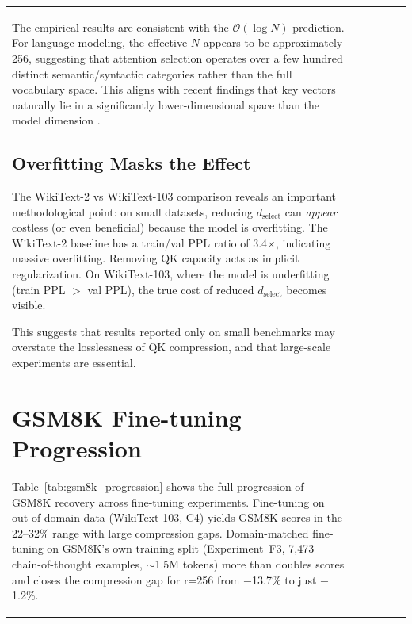 \documentclass[11pt]{article}
\newcommand{\dselect}{d_{\text{select}}}
\newcommand{\BigO}{\mathcal{O}}
\begin{document}
\begin{table}[h]
\begin{tabular}{lccccc}
The empirical results are consistent with the $\BigO(\log N)$ prediction. For language modeling, the effective $N$ appears to be approximately 256, suggesting that attention selection operates over a few hundred distinct semantic/syntactic categories rather than the full vocabulary space. This aligns with recent findings that key vectors naturally lie in a significantly lower-dimensional space than the model dimension \citep{loki2024}.


\subsection{Overfitting Masks the Effect}

The WikiText-2 vs WikiText-103 comparison reveals an important methodological point: on small datasets, reducing $\dselect$ can \emph{appear} costless (or even beneficial) because the model is overfitting. The WikiText-2 baseline has a train/val PPL ratio of 3.4$\times$, indicating massive overfitting. Removing QK capacity acts as implicit regularization. On WikiText-103, where the model is underfitting (train PPL $>$ val PPL), the true cost of reduced $\dselect$ becomes visible.

This suggests that results reported only on small benchmarks may overstate the losslessness of QK compression, and that large-scale experiments are essential.


\section{GSM8K Fine-tuning Progression}\label{app:gsm8k}

Table~\ref{tab:gsm8k_progression} shows the full progression of GSM8K recovery across fine-tuning experiments. Fine-tuning on out-of-domain data (WikiText-103, C4) yields GSM8K scores in the 22--32\% range with large compression gaps. Domain-matched fine-tuning on GSM8K's own training split (Experiment~F3, 7{,}473 chain-of-thought examples, $\sim$1.5M tokens) more than doubles scores and closes the compression gap for r=256 from $-$13.7\% to just $-$1.2\%.


\end{tabular}
\end{table}
\end{document}
